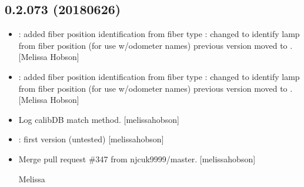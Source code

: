 \documentclass[a4paper,10pt,english]{report}
\begin{document}
\subsection{0.2.073 (2018\sphinxhyphen{}06\sphinxhyphen{}26)}
\label{\detokenize{misc/changelog:id430}}\begin{itemize}
\item {} 
: added fiber position identification from fiber
type : \sphinxhyphen{} changed to identify lamp from
fiber position (for use w/odometer names) \sphinxhyphen{} previous version moved to
. {[}Melissa Hobson{]}

\item {} 
: added fiber position identification from fiber
type : \sphinxhyphen{} changed to identify lamp from
fiber position (for use w/odometer names) \sphinxhyphen{} previous version moved to
. {[}Melissa Hobson{]}

\item {} 
Log calibDB match method. {[}melissa\sphinxhyphen{}hobson{]}

\item {} 
: first version (untested) {[}melissa\sphinxhyphen{}hobson{]}

\item {} 
Merge pull request \#347 from njcuk9999/master. {[}melissa\sphinxhyphen{}hobson{]}

Melissa

\end{itemize}
\end{document}
